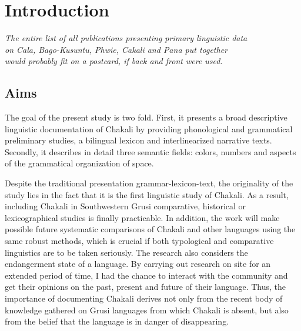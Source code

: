 
\chapter{Introduction}
\label{sec:INT-introduction}



\begin{flushright}
{\it The entire list of all publications
 presenting primary linguistic data \\
on Cala, Bago-Kusuntu, Phwie, Cakali
 and Pana put together \\would probably
 fit on a postcard, if back and front
 were used. }\\[2ex]


\end{flushright}





\section{Aims}
\label{sec:INT-aims}

The goal of the present study is two fold.  First, it  presents a broad
descriptive linguistic documentation of Chakali  by providing phonological and
grammatical preliminary studies, a bilingual lexicon and interlinearized
narrative texts. Secondly,  it describes in detail three semantic fields: 
colors, numbers and aspects of the grammatical organization of space.  

Despite the traditional presentation  grammar-lexicon-text, the originality of
the study lies in the fact that it is the first linguistic study of Chakali.  As
a result, including Chakali in Southwestern Grusi comparative, historical or
lexicographical studies is finally practicable. In addition,  the work will make
possible future systematic comparisons of Chakali and other languages using the
same robust methods, which is crucial   if both typological and comparative 
linguistics are to be taken seriously. The research also considers the
endangerment state of a
language.  By carrying out research on site for an extended period of time, I
had the chance to interact  with the community and get their opinions on the
past, present and future of their language.  Thus, the importance of documenting
Chakali  derives not only from the recent body of knowledge gathered on Grusi
languages from which Chakali is absent, but also from the  belief that the
language is in danger of disappearing.

